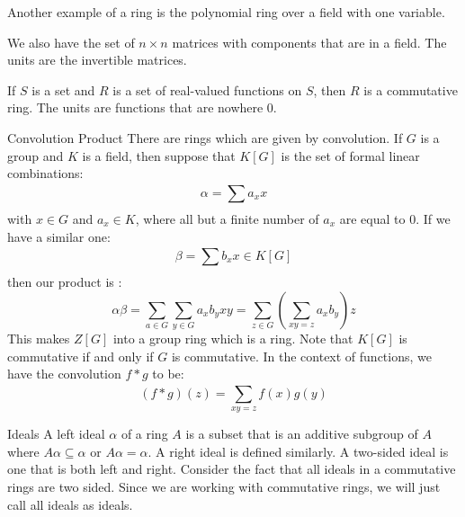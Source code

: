 \documentclass{report}
\begin{document}
\begin{examples}
    \begin{example}
        Another example of a ring is the polynomial ring over a field with one variable.
    \end{example}

    \begin{example}
        We also have the set of $n \times n$ matrices with components that are in a field. The units are the invertible matrices.
    \end{example}

    \begin{example}
        If $S$ is a set and $R$ is a set of real-valued functions on $S$, then $R$ is a commutative ring. The units are functions that are nowhere 0.
    \end{example}
\end{examples}

\begin{definition}{Convolution Product}
    There are rings which are given by convolution. If $G$ is a group and $K$ is a field, then suppose that $K[G]$ is the set of formal linear combinations:
        \begin{equation*}
            \alpha = \sum_{}^{} a_{x}x
        \end{equation*}
    with $x \in G$ and $a_{x} \in K$, where all but a finite number of $a_{x}$ are equal to $0$. If we have a similar one:
        \begin{equation*}
            \beta = \sum_{}^{} b_{x}x \in K[G]
        \end{equation*}
    then our product is :
        \begin{equation*}
            \alpha\beta = \sum_{a \in G}^{} \sum_{y \in G}^{} a_{x}b_{y}xy =\sum_{z \in G}^{} \left(\sum_{xy = z}^{} a_{x}b_{y}\right)z
        \end{equation*}
    This makes $Z[G]$ into a group ring which is a ring. Note that $K[G]$ is commutative if and only if $G$ is commutative. In the context of functions, we have the convolution $f * g$ to be:
        \begin{equation*}
            (f * g)(z) = \sum_{xy = z}^{} f(x)g(y)
        \end{equation*}
\end{definition}

\begin{definition}{Ideals}
    A left ideal $\alpha$ of a ring $A$ is a subset that is an additive subgroup of $A$ where $A\alpha\subseteq \alpha$ or $A\alpha = \alpha$. A right ideal is defined similarly. A two-sided ideal is one that is both left and right. Consider the fact that all ideals in a commutative rings are two sided. Since we are working with commutative rings, we will just call all ideals as ideals.
\end{definition}
\end{document}
